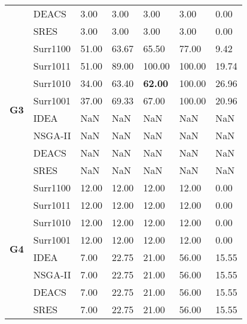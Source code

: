 \begin{table*}[!htb]
\begin{tabular}{lllllll}
		& DEACS         & 3.00          & 3.00          & 3.00            & 3.00           & 0.00         \\ 
		& SRES          & 3.00          & 3.00          & 3.00            & 3.00           & 0.00         \\ \hline
		\multirow{8}{*}{\textbf{G3}}                & Surr1100      & 51.00         & 63.67         & 65.50           & 77.00          & 9.42         \\ 
		& Surr1011      & 51.00         & 89.00         & 100.00          & 100.00         & 19.74        \\  
		& Surr1010      & 34.00         & 63.40         & \textbf{62.00}  & 100.00         & 26.96        \\ 
		& Surr1001      & 37.00         & 69.33         & 67.00           & 100.00         & 20.96        \\ 
		& IDEA          & NaN           & NaN           & NaN             & NaN            & NaN          \\ 
		& NSGA-II       & NaN           & NaN           & NaN             & NaN            & NaN          \\ 
		& DEACS         & NaN           & NaN           & NaN             & NaN            & NaN          \\  
		& SRES          & NaN           & NaN           & NaN             & NaN            & NaN          \\ \hline
		\multirow{8}{*}{\textbf{G4}}                & Surr1100      & 12.00         & 12.00         & 12.00           & 12.00          & 0.00         \\  
		& Surr1011      & 12.00         & 12.00         & 12.00           & 12.00          & 0.00         \\ 
		& Surr1010      & 12.00         & 12.00         & 12.00           & 12.00          & 0.00         \\  
		& Surr1001      & 12.00         & 12.00         & 12.00           & 12.00          & 0.00         \\ 
		& IDEA          & 7.00          & 22.75         & 21.00           & 56.00          & 15.55        \\  
		& NSGA-II       & 7.00          & 22.75         & 21.00           & 56.00          & 15.55        \\  
		& DEACS         & 7.00          & 22.75         & 21.00           & 56.00          & 15.55        \\  
		& SRES          & 7.00          & 22.75         & 21.00           & 56.00          & 15.55        \\ \hline

\end{tabular}
\end{table*}
